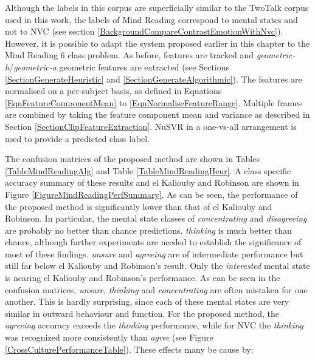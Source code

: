 Although the labels in this corpus are superficially similar to the TwoTalk corpus used in this work, the labels of Mind Reading correspond to mental states and not to \ac{NVC} (see section \ref{BackgroundCompareContrastEmotionWithNvc}). However, it is possible to adapt the system proposed earlier in this chapter to the Mind Reading 6 class problem. As before,  features are tracked and \textit{geometric-h}/\textit{geometric-a} geometric features are extracted (see Sections \ref{SectionGenerateHeuristic} and \ref{SectionGenerateAlgorithmic}). The features are normalised on a per-subject basis, as defined in Equations \ref{EqnFeatureComponentMean} to \ref{EqnNormaliseFeatureRange}. Multiple frames are combined by taking the feature component mean and variance as described in Section \ref{SectionClipFeatureExtraction}. NuSVR in a one-vs-all arrangement is used to provide a predicted class label.

The confusion matrices of the proposed method are shown in Tables \ref{TableMindReadingAlg} and Table \ref{TableMindReadingHeur}. A class specific accuracy summary of these results and el Kaliouby and Robinson are shown in Figure \ref{FigureMindReadingPerfSummary}. As can be seen, the performance of the proposed method is significantly lower than that of el Kaliouby and Robinson. In particular, the mental state classes of \textit{concentrating} and \textit{disagreeing} are probably no better than chance predictions. \textit{thinking} is much better than chance, although further experiments are needed to establish the significance of most of these findings. \textit{unsure} and \textit{agreeing} are of intermediate performance but still far below el Kaliouby and Robinson's result. Only the \textit{interested} mental state is nearing el Kaliouby and Robinson's performance. As can be seen in the confusion matrices, \textit{unsure}, \textit{thinking} and \textit{concentrating} are often mistaken for one another. This is hardly surprising, since each of these mental states are very similar in outward behaviour and function. For the proposed method, the \textit{agreeing} accuracy exceeds the \textit{thinking} performance, while for \ac{NVC} the \textit{thinking} was recognized more consistently than \textit{agree} (see Figure \ref{CrossCulturePerformanceTable}). These effects many be cause by:

